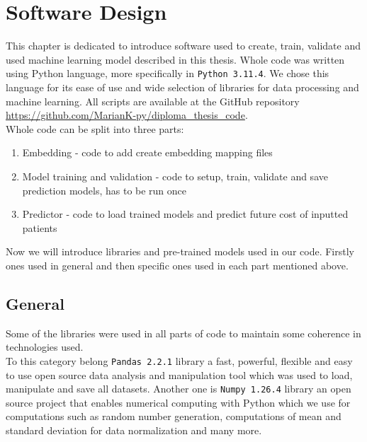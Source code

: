 
\chapter{Software Design} \label{chap:softwaredesign}

This chapter is dedicated to introduce software used to create, train, validate and used machine learning model described in this thesis.
Whole code was written using Python language, more specifically in \texttt{Python 3.11.4}. We chose this language for its ease of use and wide selection of libraries for data processing and machine learning. All scripts are available at the GitHub repository \url{https://github.com/MarianK-py/diploma_thesis_code}.
\\

Whole code can be split into three parts:

\begin{enumerate}
	\item Embedding - code to add create embedding mapping files
	\item Model training and validation - code to setup, train, validate and save prediction models, has to be run once 
	\item Predictor - code to load trained models and predict future cost of inputted patients 
\end{enumerate}

Now we will introduce libraries and pre-trained models used in our code. Firstly ones used in general and then specific ones used in each part mentioned above.

\section{General}

Some of the libraries were used in all parts of code to maintain some coherence in technologies used. 
\\

To this category belong \texttt{Pandas 2.2.1} library a fast, powerful, flexible and easy to use open source data analysis and manipulation tool \cite{pandas} which was used to load, manipulate and save all datasets. Another one is \texttt{Numpy 1.26.4} library an open source project that enables numerical computing with Python \cite{numpy} which we use for computations such as random number generation, computations of mean and standard deviation for data normalization and many more.


